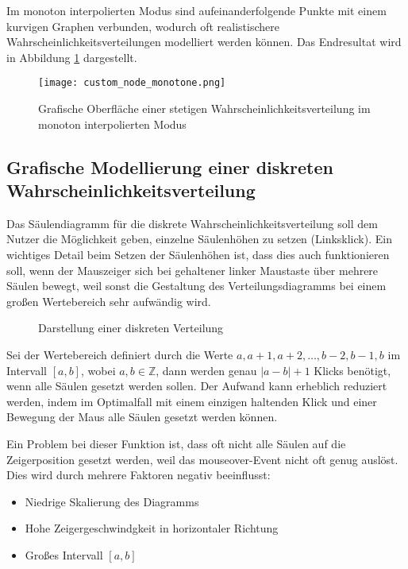 Im monoton interpolierten Modus sind aufeinanderfolgende Punkte mit einem kurvigen Graphen verbunden, wodurch oft realistischere Wahrscheinlichkeitsverteilungen modelliert werden können. Das Endresultat wird in Abbildung \ref{fig:customnodemonotone} dargestellt.

\begin{figure}[H]
    \centering
    \texttt{[image: custom\_node\_monotone.png]}
    \caption{Grafische Oberfläche einer stetigen Wahrscheinlichkeitsverteilung im monoton interpolierten Modus}
    \label{fig:customnodemonotone}
\end{figure}

\subsection{Grafische Modellierung einer diskreten Wahrscheinlichkeitsverteilung}

Das Säulendiagramm für die diskrete Wahrscheinlichkeitsverteilung soll dem Nutzer die Möglichkeit geben, einzelne Säulenhöhen zu setzen (Linksklick). Ein wichtiges Detail beim Setzen der Säulenhöhen ist, dass dies auch funktionieren soll, wenn der Mauszeiger sich bei gehaltener linker Maustaste über mehrere Säulen bewegt, weil sonst die Gestaltung des Verteilungsdiagramms bei einem großen Wertebereich sehr aufwändig wird. 

\begin{figure}[H]
    \center
    \caption{Darstellung einer diskreten Verteilung}
\end{figure}

Sei der Wertebereich definiert durch die Werte $a,a+1,a+2,\dots,b-2,b-1,b$ im Intervall $[a,b]$, wobei $a,b \in\mathbb{Z}$, dann werden genau $|a-b|+1$ Klicks benötigt, wenn alle Säulen gesetzt werden sollen. Der Aufwand kann erheblich reduziert werden, indem im Optimalfall mit einem einzigen haltenden Klick und einer Bewegung der Maus alle Säulen gesetzt werden können.

Ein Problem bei dieser Funktion ist, dass oft nicht alle Säulen auf die Zeigerposition gesetzt werden, weil das mouseover-Event nicht oft genug auslöst. Dies wird durch mehrere Faktoren negativ beeinflusst:
\begin{itemize}
    \item Niedrige Skalierung des Diagramms
    \item Hohe Zeigergeschwindgkeit in horizontaler Richtung
    \item Großes Intervall $[a,b]$
 \end{itemize}

